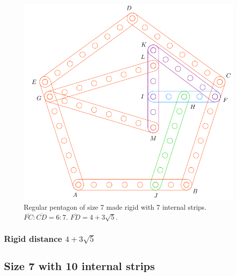 \documentclass[11pt]{article}
\begin{document}
\begin{figure}[H]
\centering
\includegraphics[scale=0.7]{7/penta7-6a}
\caption{Regular pentagon of size 7 made rigid with 7 internal strips. $\overline{FC} : \overline{CD} = 6:7$. $\overline{FD} = 4 + 3\sqrt5$.}
\label{fig:penta6-10a}
\end{figure}

\subsubsection{Rigid distance $4 + 3\sqrt5$}


\subsection{Size 7 with 10 internal strips}
\end{document}
